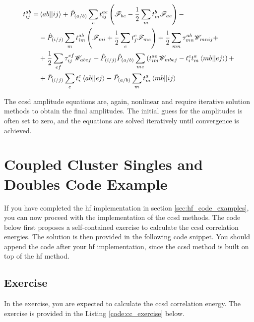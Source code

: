 \begin{align}
t_{ij}^{ab}=&\braket{ab||ij}+\hat{P}_{(a/b)}\sum_et_{ij}^{ae}\left(\mathscr{F}_{be}-\frac{1}{2}\sum_mt_m^b\mathscr{F}_{ae}\right)-\nonumber \\
&-\hat{P}_{(i/j)}\sum_mt_{im}^{ab}\left(\mathscr{F}_{mi}+\frac{1}{2}\sum_et_j^e\mathscr{F}_{me}\right)+\frac{1}{2}\sum_{mn}\tau_{mn}^{ab}\mathscr{W}_{mnij}+\nonumber \\
&+\frac{1}{2}\sum_{ef}\tau_{ij}^{ef}\mathscr{W}_{abef}+\hat{P}_{(i/j)}\hat{P}_{(a/b)}\sum_{me}\left(t_{im}^{ae}\mathscr{W}_{mbej}-t_i^et_m^a\braket{mb||ej}\right)+\nonumber \\
&+\hat{P}_{(i/j)}\sum_et_i^e\braket{ab||ej}-\hat{P}_{(a/b)}\sum_mt_m^a\braket{mb||ij}
\end{align}

The \acrshort{ccsd} amplitude equations are, again, nonlinear and require iterative solution methods to obtain the final amplitudes. The initial guess for the amplitudes is often set to zero, and the equations are solved iteratively until convergence is achieved.

\section{Coupled Cluster Singles and Doubles Code Example}

If you have completed the \acrshort{hf} implementation in section \ref{sec:hf_code_examples}, you can now proceed with the implementation of the \acrshort{ccsd} methods. The code below first proposes a self-contained exercise to calculate the \acrshort{ccsd} correlation energies. The solution is then provided in the following code snippet. You should append the code after your \acrshort{hf} implementation, since the \acrshort{ccsd} method is built on top of the \acrshort{hf} method.

\subsection{Exercise}

In the exercise, you are expected to calculate the \acrshort{ccsd} correlation energy. The exercise is provided in the Listing \ref{code:cc_exercise} below.

